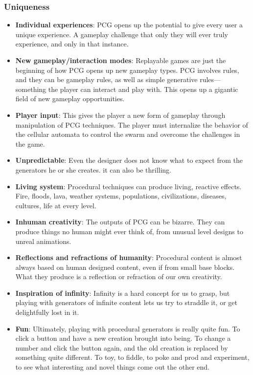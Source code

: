 \documentclass[MGS,Master,english]{twbook}%
\begin{document}
\subsubsection{Uniqueness}
\begin{itemize}
	\item \textbf{Individual experiences}: PCG opens up the potential to give every user a unique experience. A gameplay challenge that only they will ever truly experience, and only in that instance. \cite{pcg::inGameDesign}
	\item \textbf{New gameplay/interaction modes}: Replayable games are just the beginning of how PCG opens up new gameplay types. PCG involves rules, and they can be gameplay rules, as well as simple generative rules— something the player can interact and play with. This opens up a gigantic field of new gameplay opportunities. \cite{pcg::inGameDesign}
	\item \textbf{Player input}: This gives the player a new form of gameplay through manipulation of PCG techniques. The player must internalize the behavior of the cellular automata to control the swarm and overcome the challenges in the game. \cite{pcg::inGameDesign}
	\item \textbf{Unpredictable}: Even the designer does not know what to expect from the generators he or she creates. it can also be thrilling. \cite{pcg::inGameDesign}
	\item \textbf{Living system}: Procedural techniques can produce living, reactive effects. Fire, floods, lava, weather systems, populations, civilizations, diseases, cultures, life at every level. \cite{pcg::inGameDesign}
	\item \textbf{Inhuman creativity}: The outputs of PCG can be bizarre. They can produce things no human might ever think of, from unusual level designs to unreal animations. \cite{pcg::inGameDesign}
	\item \textbf{Reflections and refractions of humanity}: Procedural content is almost always based on human designed content, even if from small base blocks. What they produce is a reflection or refraction of our own	creativity. \cite{pcg::inGameDesign}
	\item \textbf{Inspiration of infinity}: Infinity is a hard concept for us to grasp, but	playing with generators of infinite content lets us try to straddle it,	or get delightfully lost in it. \cite{pcg::inGameDesign}
	\item \textbf{Fun}: Ultimately, playing with procedural generators is really quite fun. To click a button and have a new creation brought into being. To change a number and click the button again, and the old creation is replaced by something quite different. To toy, to fiddle, to poke and prod and experiment, to see what interesting and novel things come out the other end. \cite{pcg::inGameDesign}
\end{itemize}
\end{document}
